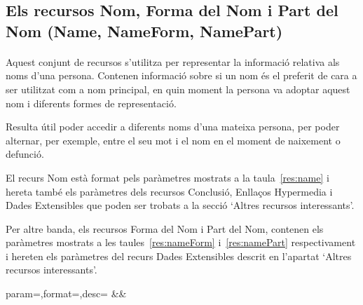 \subsection{Els recursos Nom, Forma del Nom i Part del Nom (Name, NameForm, NamePart)}

    \paragraph{}
    Aquest conjunt de recursos s'utilitza per representar la informació relativa als noms d'una persona.  Contenen informació sobre si un nom és el preferit de cara a ser utilitzat com a nom principal, en quin moment la persona va adoptar aquest nom i diferents formes de representació.

    Resulta útil poder accedir a diferents noms d'una mateixa persona, per poder alternar, per exemple, entre el seu mot i el nom en el moment de naixement o defunció.

    El recurs Nom està format pels paràmetres mostrats a la taula~\ref{res:name} i hereta també els paràmetres dels recursos Conclusió, Enllaços Hypermedia i Dades Extensibles que poden ser trobats a la secció `Altres recursos interessants'.

    Per altre banda, els recursos Forma del Nom i Part del Nom, contenen els paràmetres mostrats a les taules~\ref{res:nameForm} i~\ref{res:namePart} respectivament i hereten els paràmetres del recurs Dades Extensibles descrit en l'apartat `Altres recursos interessants'.

    \begin{center}
             {param=\param,format=\format,desc=\desc}
             {\param&\format&\desc}
     \end{center}

